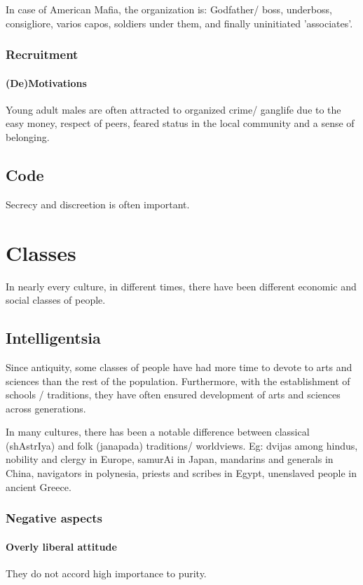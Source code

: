 \documentclass[oneside, article]{memoir}
\begin{document}
In case of American Mafia, the organization is: Godfather/ boss, underboss, consigliore, varios capos, soldiers under them, and finally uninitiated 'associates'.

\subsection{Recruitment}
\subsubsection{(De)Motivations}
Young adult males are often attracted to organized crime/ ganglife due to the easy money, respect of peers, feared status in the local community and a sense of belonging.

\section{Code}
Secrecy and discreetion is often important.

\chapter{Classes}
In nearly every culture, in different times, there have been different economic and social classes of people.

\section{Intelligentsia}
Since antiquity, some classes of people have had more time to devote to arts and sciences than the rest of the population. Furthermore, with the establishment of schools / traditions, they have often ensured development of arts and sciences across generations.

In many cultures, there has been a notable difference between classical (shAstrIya) and folk (janapada) traditions/ worldviews. Eg: dvijas among hindus, nobility and clergy in Europe, samurAi in Japan, mandarins and generals in China, navigators in polynesia, priests and scribes in Egypt, unenslaved people in ancient Greece.

\subsection{Negative aspects}
\subsubsection{Overly liberal attitude}
They do not accord high importance to purity.
\end{document}
